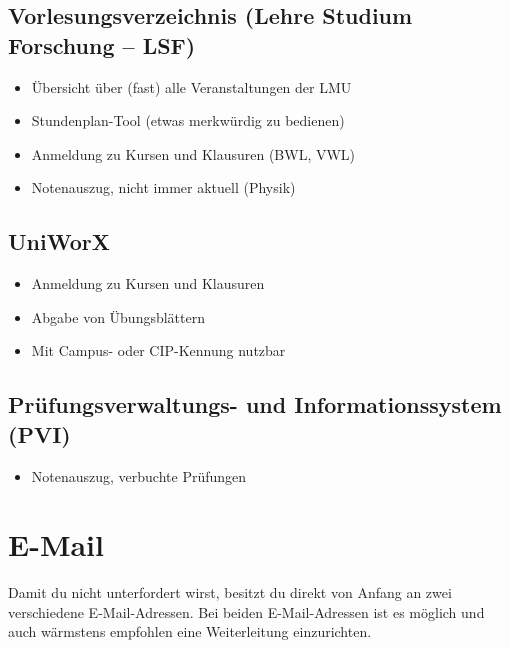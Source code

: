 \subsection*{Vorlesungsverzeichnis (Lehre Studium Forschung -- LSF)}
\begin{itemize}
	\item Übersicht über (fast) alle Veranstaltungen der LMU
	\item Stundenplan-Tool (etwas merkwürdig zu bedienen)
	\item Anmeldung zu Kursen und Klausuren (BWL, VWL)
	\item Notenauszug, nicht immer aktuell (Physik)
\end{itemize}
\begin{urlList}
\end{urlList}

\subsection*{UniWorX\subjectList{\subjectI{}\subjectMI{}}}
\begin{itemize}
	\item Anmeldung zu Kursen und Klausuren
	\item Abgabe von Übungsblättern
	\item Mit Campus- oder CIP-Kennung nutzbar
\end{itemize}
\begin{urlList}
\end{urlList}

\subsection*{Prüfungsverwaltungs- und Informationssystem (PVI)\subjectList{\subjectI{}\subjectMI{}}}
\begin{itemize}
	\item Notenauszug, verbuchte Prüfungen
\end{itemize}
\begin{urlList}
\end{urlList}

\section{E-Mail}
Damit du nicht unterfordert wirst, besitzt du direkt von Anfang an zwei verschiedene E-Mail-Adressen. Bei beiden E-Mail-Adressen ist es möglich und auch wärmstens empfohlen eine Weiterleitung einzurichten.

